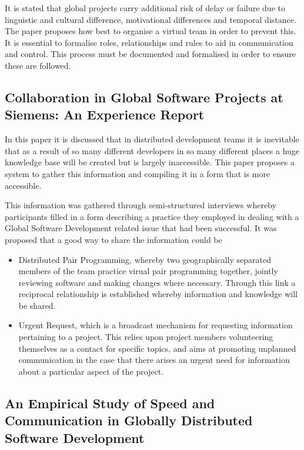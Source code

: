 \documentclass{l4proj}
\begin{document}
It is stated that global projects carry additional risk of delay or failure due to linguistic and cultural difference, motivational differences and temporal distance.  The paper proposes how best to organise a virtual team in order to prevent this.  It is essential to formalise roles, relationships and rules to aid in communication and control.  This process must be documented and formalised in order to ensure these are followed. 


\subsection {Collaboration in Global Software Projects at Siemens: An Experience Report}

In this paper it is discussed that in distributed development teams it is inevitable that as a result of so many different developers in so many different places a huge knowledge base will be created but is largely inaccessible.  This paper proposes a system to gather this information and compiling it in a form that is more accessible.

This information was gathered through semi-structured interviews whereby participants filled in a form describing a practice they employed in dealing with a Global Software Development related issue that had been successful.  It was proposed that a good way to share the information could be

\begin{itemize}
\item Distributed Pair Programming, whereby two geographically separated members of the team practice virual pair programming together, jointly reviewing software and making changes where necessary.  Through this link a reciprocal relationship is established whereby information and knowledge will be shared.
\item Urgent Request, which is a broadcast mechanism for requesting information pertaining to a project.  This relies upon project members volunteering themselves as a contact for specific topics, and aims at promoting unplanned communication in the case that there arises an urgent need for information about a particular aspect of the project.
\end{itemize}



\subsection {An Empirical Study of Speed and Communication in Globally Distributed Software Development}
\end{document}
